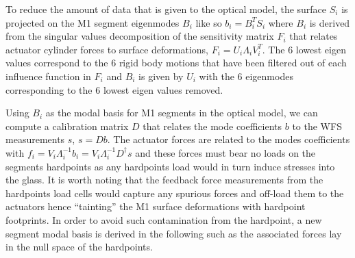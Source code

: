\documentclass{gmto}
\begin{document}
To reduce the amount of data that is given to the optical model, the surface
$S_i$ is projected on the M1 segment eigenmodes $B_i$ like so $b_i = B_i^TS_i$
where $B_i$ is derived from the singular values decomposition of the sensitivity
matrix $F_i$ that relates actuator cylinder forces to surface deformations, $F_i
= U_i \Lambda_i V_i^T$.
The 6 lowest eigen values correspond to the 6 rigid body motions that have been
filtered out of each influence function in $F_i$ and $B_i$ is given by $U_i$
with the 6 eigenmodes corresponding to the 6 lowest eigen values removed.

Using $B_i$ as the modal basis for M1 segments in the optical model, we can compute
a calibration matrix $D$ that relates the mode coefficients $b$ to the WFS
measurements $s$, $s=Db$.
The actuator forces are related to the modes coefficients with $f_i =
V_i\Lambda_i^{-1}b_i = V_i\Lambda_i^{-1}D^\dagger s$ and these forces must bear
no loads on the segments hardpoints as any hardpoints load would in turn induce
stresses into the glass.
It is worth noting that the feedback force measurements from the hardpoints load cells
would capture any spurious forces and off-load them to the actuators hence
``tainting'' the M1 surface deformations with hardpoint footprints.
In order to avoid such contamination from the hardpoint, a new segment modal
basis is derived in the following such as the associated forces lay in the null
space of the hardpoints.
\end{document}
